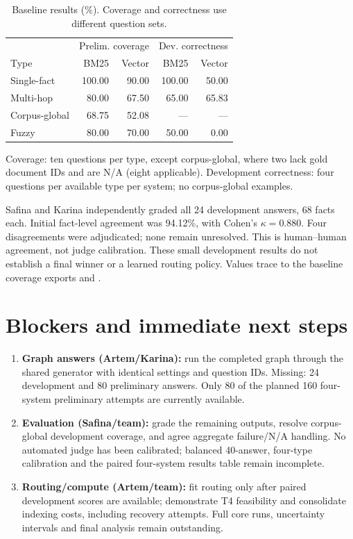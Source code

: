 \documentclass[conference]{IEEEtran}
\begin{document}
\begin{table}[ht]
\centering
\caption{Baseline results (\%). Coverage and correctness use different question sets.}
\label{tab:results}
\small
\setlength{\tabcolsep}{4pt}
\begin{tabular}{@{}lrrrr@{}}
\toprule
& \multicolumn{2}{c}{Prelim. coverage} & \multicolumn{2}{c}{Dev. correctness} \\
Type & BM25 & Vector & BM25 & Vector \\
\midrule
Single-fact   & 100.00 & 90.00 & 100.00 & 50.00 \\
Multi-hop     & 80.00 & 67.50 & 65.00 & 65.83 \\
Corpus-global & 68.75 & 52.08 & --- & --- \\
Fuzzy         & 80.00 & 70.00 & 50.00 & 0.00 \\
\bottomrule
\end{tabular}

\smallskip
\parbox{\columnwidth}{\footnotesize
Coverage: ten questions per type, except corpus-global, where two lack
gold document IDs and are N/A (eight applicable). Development correctness:
four questions per available type per system; no corpus-global examples.}
\end{table}

Safina and Karina independently graded all 24 development answers,
68 facts each. Initial fact-level agreement was 94.12\%, with Cohen's
$\kappa=0.880$. Four disagreements were adjudicated; none remain unresolved.
This is human--human agreement, not judge calibration. These small development
results do not establish a final winner or a learned routing policy.
Values trace to the baseline coverage exports and
.

\section{Blockers and immediate next steps}
\begin{enumerate}
\item \textbf{Graph answers (Artem/Karina):} run the completed graph through
the shared generator with identical settings and question IDs. Missing:
24 development and 80 preliminary answers. Only 80 of the planned 160
four-system preliminary attempts are currently available.
\item \textbf{Evaluation (Safina/team):} grade the remaining outputs, resolve
corpus-global development coverage, and agree aggregate failure/N/A handling.
No automated judge has been calibrated; balanced 40-answer, four-type
calibration and the paired four-system results table remain incomplete.
\item \textbf{Routing/compute (Artem/team):} fit routing only after paired
development scores are available; demonstrate T4 feasibility and consolidate
indexing costs, including recovery attempts. Full core runs, uncertainty
intervals and final analysis remain outstanding.
\end{enumerate}
\end{document}
